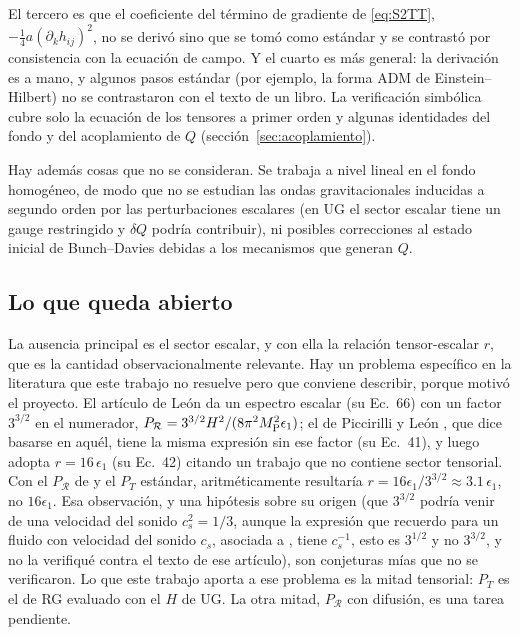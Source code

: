 El tercero es que el coeficiente del término de gradiente de \eqref{eq:S2TT}, $-\tfrac14a(\partial_kh_{ij})^2$, no se derivó sino que se tomó como estándar y se contrastó por consistencia con la ecuación de campo. Y el cuarto es más general: la derivación es a mano, y algunos pasos estándar (por ejemplo, la forma ADM de Einstein--Hilbert) no se contrastaron con el texto de un libro. La verificación simbólica cubre solo la ecuación de los tensores a primer orden y algunas identidades del fondo y del acoplamiento de $Q$ (sección~\ref{sec:acoplamiento}).

Hay además cosas que no se consideran. Se trabaja a nivel lineal en el fondo homogéneo, de modo que no se estudian las ondas gravitacionales inducidas a segundo orden por las perturbaciones escalares (en UG el sector escalar tiene un gauge restringido y $\delta Q$ podría contribuir), ni posibles correcciones al estado inicial de Bunch--Davies debidas a los mecanismos que generan $Q$.

\subsection{Lo que queda abierto}
\label{sec:abiertos}

La ausencia principal es el sector escalar, y con ella la relación tensor-escalar $r$, que es la cantidad observacionalmente relevante. Hay un problema específico en la literatura que este trabajo no resuelve pero que conviene describir, porque motivó el proyecto. El artículo de León \cite{leon22} da un espectro escalar (su Ec.~66) con un factor $3^{3/2}$ en el numerador, $P_\mathcal{R}=3^{3/2}H^2/(8\pi^2M_{\rm P}^2\epsilon_1)$; el de Piccirilli y León \cite{piccirilli23}, que dice basarse en aquél, tiene la misma expresión sin ese factor (su Ec.~41), y luego adopta $r=16\,\epsilon_1$ (su Ec.~42) citando un trabajo que no contiene sector tensorial. Con el $P_\mathcal{R}$ de \cite{leon22} y el $P_T$ estándar, aritméticamente resultaría $r=16\epsilon_1/3^{3/2}\approx3.1\,\epsilon_1$, no $16\epsilon_1$. Esa observación, y una hipótesis sobre su origen (que $3^{3/2}$ podría venir de una velocidad del sonido $c_s^2=1/3$, aunque la expresión que recuerdo para un fluido con velocidad del sonido $c_s$, asociada a \cite{garriga99}, tiene $c_s^{-1}$, esto es $3^{1/2}$ y no $3^{3/2}$, y no la verifiqué contra el texto de ese artículo), son conjeturas mías que no se verificaron. Lo que este trabajo aporta a ese problema es la mitad tensorial: $P_T$ es el de RG evaluado con el $H$ de UG. La otra mitad, $P_\mathcal{R}$ con difusión, es una tarea pendiente.

